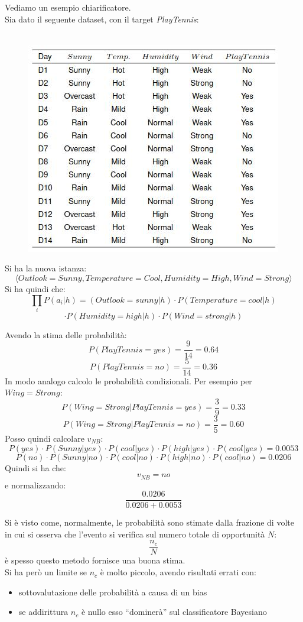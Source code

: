 \begin{esempio}
  Vediamo un esempio chiarificatore.\\
  Sia dato il seguente dataset, con il target \textit{PlayTennis}:
  \begin{figure}[H]
    \centering
\    \includegraphics[scale = 0.7]{img/cbn.jpg}
  \end{figure}
  Si ha la nuova istanza:
  \[\langle Outlook=Sunny, Temperature=Cool, Humidity=High,
      Wind=Strong \rangle\]
  Si ha quindi che:
  \[\prod_iP(a_i|h)=(Outlook=sunny|h)\cdot
      P(Temperature=cool|h)\]\[\cdot P(Humidity=high|h)\cdot
      P(Wind=strong|h)\]
 
  Avendo la stima delle probabilità:
  \[P(PlayTennis=yes)=\frac{9}{14}=0.64\]
  \[P(PlayTennis=no)=\frac{5}{14}=0.36\]
  In modo analogo calcolo le probabilità condizionali. Per esempio per
  $Wing=Strong$:
  \[P(Wing=Strong|PlayTennis=yes)=\frac{3}{9}=0.33\]
  \[P(Wing=Strong|PlayTennis=no)=\frac{3}{5}=0.60\]
  Posso quindi calcolare $v_{NB}$:
  \[P(yes)\cdot P(Sunny|yes)\cdot P(cool|yes)\cdot P(high|yes)\cdot
    P(cool|yes)=0.0053\]
  \[P(no)\cdot P(Sunny|no)\cdot P(cool|no)\cdot P(high|no)\cdot
    P(cool|no)=0.0206\]
  Quindi si ha che:
  \[v_{NB}=no\]
  e normalizzando:
  \[\frac{0.0206}{0.0206+0.0053}\]
\end{esempio}
Si è visto come, normalmente, le probabilità sono stimate dalla frazione di
volte in cui si osserva che l'evento si verifica sul numero totale di
opportunità $N$:
\[\frac{n_c}{N}\]
è spesso questo metodo fornisce una buona stima.\\
Si ha però un limite se $n_c$ è molto piccolo, avendo risultati errati con:
\begin{itemize}
  \item sottovalutazione delle probabilità a causa di un bias
  \item se addirittura $n_c$ è nullo esso ``dominerà'' sul classificatore
  Bayesiano 
\end{itemize}
